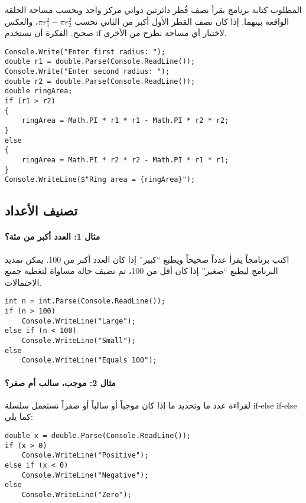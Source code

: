 \documentclass[12pt]{article}
\begin{document}
المطلوب كتابة برنامج يقرأ نصف قُطر دائرتين ذواتي مركز واحد ويحسب مساحة الحلقة الواقعة بينهما. إذا كان نصف القطر الأول أكبر من الثاني نحسب \(\pi r_{1}^{2} - \pi r_{2}^{2}\)، والعكس صحيح. الفكرة أن نستخدم \textenglish{if} لاختيار أي مساحة نطرح من الأخرى.

\begin{english}
\begin{verbatim}
Console.Write("Enter first radius: ");
double r1 = double.Parse(Console.ReadLine());
Console.Write("Enter second radius: ");
double r2 = double.Parse(Console.ReadLine());
double ringArea;
if (r1 > r2)
{
    ringArea = Math.PI * r1 * r1 - Math.PI * r2 * r2;
}
else
{
    ringArea = Math.PI * r2 * r2 - Math.PI * r1 * r1;
}
Console.WriteLine($"Ring area = {ringArea}");
\end{verbatim}
\end{english}

\subsection{تصنيف الأعداد}

\paragraph{مثال 1: العدد أكبر من مئة؟} اكتب برنامجاً يقرأ عدداً صحيحاً ويطبع ``كبير'' إذا كان العدد أكبر من 100. يمكن تمديد البرنامج ليطبع ``صغير'' إذا كان أقل من 100، ثم نضيف حالة مساواة لتغطية جميع الاحتمالات.

\begin{english}
\begin{verbatim}
int n = int.Parse(Console.ReadLine());
if (n > 100)
    Console.WriteLine("Large");
else if (n < 100)
    Console.WriteLine("Small");
else
    Console.WriteLine("Equals 100");
\end{verbatim}
\end{english}

\paragraph{مثال 2: موجب، سالب أم صفر؟} لقراءة عدد ما وتحديد ما إذا كان موجباً أو سالباً أو صفراً نستعمل سلسلة \textenglish{if‑else if‑else} كما يلي:

\begin{english}
\begin{verbatim}
double x = double.Parse(Console.ReadLine());
if (x > 0)
    Console.WriteLine("Positive");
else if (x < 0)
    Console.WriteLine("Negative");
else
    Console.WriteLine("Zero");
\end{verbatim}
\end{english}
\end{document}
